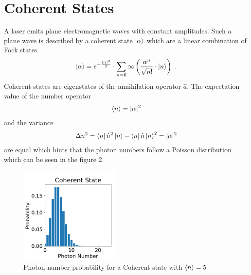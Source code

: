 \section{Coherent States}
A laser emits plane electromagnetic waves with constant amplitudes. Such a plane wave is described by a coherent state $\ket{\alpha}$ which are a linear combination of Fock states \begin{equation}
    \ket{\alpha}=e^{-\frac{|\alpha|^{2}}{2}}\cdot \sum_{n=0}{\infty}\left(\frac{\alpha ^{n}}{\sqrt{n!}}\cdot \ket{n}\right)~.
\end{equation}
Coherent states are eigenstates of the annihilation operator $\hat{a}$. The expectation value of the number operator \begin{equation}
    \braket{n}=|\alpha|^{2}
\end{equation}
and the variance 
\begin{equation}
    \Delta n^{2}=\bra{n}\hat{n}^{2}\ket{n}-\bra{n}\hat{n}\ket{n}^{2}=|\alpha|^{2}
\end{equation}
are equal which hints that the photon numbers follow a Poisson distribution which can be seen in the figure 2.
\begin{figure}[H]
    \centering
    \includegraphics[width=50mm,scale=0.5]{Quantenoptik/include/Coherent state.PNG}
    \caption{Photon number probability for a Coherent state with $\braket{n}=5$} 
    \label{fig:Coherent state}
\end{figure}


